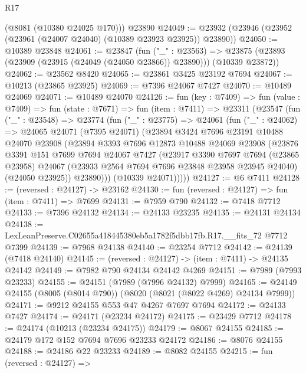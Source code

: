 \begin{lexlean}{R17}
\begin{coremodule}
      (@8081 (@10380 @24025 @170)))
    @23890
@24049 := @23932 (@23946 (@23952 (@23961 (@24007 @24040) (@10389 @23923 @23925)) @23890))
@24050 := @10389 @23848
@24061 := @23847
    (fun ("_" : @23563) =>
    @23875 (@23893 (@23909 (@23915 (@24049 (@24050 @23866)) @23890))) (@10339 @23872))
@24062 := @23562 @8420
@24065 := @23861 @3425 @23192 @7694
@24067 := @10213 (@23865 @23925)
@24069 := @7396 @24067 @7427
@24070 := @10489 @24069
@24071 := @10489 @24070
@24126 := fun (key : @7409) =>
  fun (value : @7409) =>
  fun (state : @7671) =>
  fun (item : @7411) =>
  @23311
    (@23547
      (fun ("_" : @23548) =>
      @23774
        (fun ("_" : @23775) =>
        @24061
          (fun ("_" : @24062) =>
          @24065
            @24071
            (@7395 @24071)
            (@23894
              @3424
              @7696
              @23191
              @10488
              @24070
              @23908
              (@23894
                @3393
                @7696
                @12873
                @10488
                @24069
                @23908
                (@23876
                  @3391
                  @151
                  @7699
                  @7694
                  @24067
                  @7427
                  (@23917
                    @3390
                    @7697
                    @7694
                    (@23865 @23958)
                    @24067
                    (@23933 @2564 @7694 @7696 @23848 @23958 @23945 @24040)
                    (@24050 @23925))
                  @23890)))
            (@10339 @24071)))))
@24127 := @6 @7411
@24128 := (reversed : @24127) -> @23162
@24130 := fun (reversed : @24127) => fun (item : @7411) => @7699
@24131 := @7959 @790
@24132 := @7418 @7712
@24133 := @7396 @24132
@24134 := @24133 @23235
@24135 := @24131 @24134
@24138 := LexLeanPreserve.C02655a418445380eb5a1782f5dbb17fb.R17.__fits_72 @7712 @7399
@24139 := @7968 @24138
@24140 := @23254 @7712
@24142 := @24139 (@7418 @24140)
@24145 := (reversed : @24127) -> (item : @7411) -> @24135 @24142
@24149 := @7982 @790 @24134 @24142 @4269
@24151 := @7989 (@7993 @23233)
@24155 := @24151 (@7989 (@7996 @24132) @7999)
@24165 := @24149 @24155 (@8005 (@8014 @790)) (@8020 (@8021 (@8022 @4269) @24134 @7999))
@24171 := @9212 @24155 @553 @47 @4267 @7697 @7694
@24172 := @24133 @7427
@24174 := @24171 (@23234 @24172)
@24175 := @23429 @7712
@24178 := @24174 (@10213 (@23234 @24175))
@24179 := @8067 @24155
@24185 := @24179 @172 @152 @7694 @7696 @23233 @24172
@24186 := @8076 @24155
@24188 := @24186 @22 @23233
@24189 := @8082 @24155
@24215 := fun (reversed : @24127) =>

\end{coremodule}
\end{lexlean}
